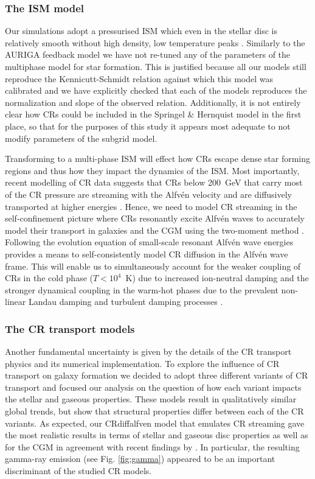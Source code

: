 \documentclass[useAMS,usenatbib]{mnras}
\begin{document}
\subsubsection{The ISM model}
Our simulations adopt a pressurised ISM which even in the stellar disc is relatively smooth without high density, low temperature peaks \citep[e.g.][figures 9 and 10]{Marinacci2019}. Similarly to the AURIGA feedback model we have not re-tuned any of the parameters of the multiphase model for star formation. This is justified because all our models still reproduce the Kennicutt-Schmidt relation \citep{Kennicutt1998ARA+A} against which this model was calibrated and we have explicitly checked that each of the models reproduces the normalization and slope of the observed relation. Additionally, it is not entirely clear how CRs could be included in the Springel \& Hernquist model in the first place, so that for the purposes of this study it appears most adequate to not modify parameters of the subgrid model.

Transforming to a multi-phase ISM will effect how CRs escape dense star forming regions and thus how they impact the dynamics of the ISM. Most importantly, recent modelling of CR data suggests that CRs below 200~GeV that carry most of the CR pressure are streaming with the Alfv\'en velocity and are diffusively transported at higher energies \citep{Evoli2018}. Hence, we need to model CR streaming in the self-confinement picture where CRs resonantly excite Alfv\'en waves to accurately model their transport in galaxies and the CGM using the two-moment method \citep{Thomas2019}. Following the evolution equation of small-scale resonant Alfv\'en wave energies provides a means to self-consistently model CR diffusion in the Alfv\'en wave frame. This will enable us to simultaneously account for the weaker coupling of CRs in the cold phase ($T<10^4$~K) due to increased ion-neutral damping and the stronger dynamical coupling in the warm-hot phases due to the prevalent non-linear Landau damping \citep[e.g.][]{McKenzie1983} and turbulent damping processes \citep[e.g.][]{Farmer2004,Yan2004}.

\subsubsection{The CR transport models}
Another fundamental uncertainty is given by the details of the CR transport physics and its numerical implementation. To explore the influence of CR transport on galaxy formation we decided to adopt three different variants of CR transport and focused our analysis on the question of how each variant impacts the stellar and gaseous properties. These models result in qualitatively similar global trends, but show that structural properties differ between each of the CR variants. As expected, our CRdiffalfven model that emulates CR streaming gave the most realistic results in terms of stellar and gaseous disc properties as well as for the CGM in agreement with recent findings by \citet{Butsky2018}. In particular, the resulting gamma-ray emission (see Fig. \ref{fig:gamma}) appeared to be an important discriminant of the studied CR models. 
\end{document}
